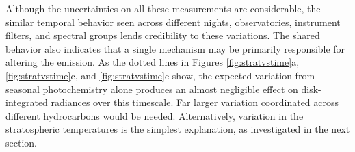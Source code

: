 \documentclass[twocolumn,10pt]{aastex631}
\begin{document}

Although the uncertainties on all these measurements are considerable, the similar temporal behavior seen across different nights, observatories, instrument filters, and spectral groups lends credibility to these variations.  The shared behavior also indicates that a single mechanism may be primarily responsible for altering the emission. As the dotted lines in Figures \ref{fig:stratvstime}a, \ref{fig:stratvstime}c, and \ref{fig:stratvstime}e show, the expected variation from seasonal photochemistry alone produces an almost negligible effect on disk-integrated radiances over this timescale. Far larger variation coordinated across different hydrocarbons would be needed.  Alternatively, variation in the stratospheric temperatures is the simplest explanation, as investigated in the next section.   

\end{document}

